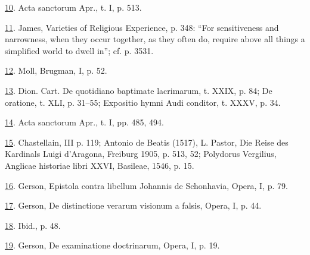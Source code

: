 \protect\hypertarget{23_NOTES.xhtmlux5cux23id_888}{\protect\hyperlink{15_Chapter_Eight__RELIGIOUS_EXCITAT.xhtmlux5cux23id_887}{10}}.
Acta sanctorum Apr., t. I, p. 513.

\protect\hypertarget{23_NOTES.xhtmlux5cux23id_886}{\protect\hyperlink{15_Chapter_Eight__RELIGIOUS_EXCITAT.xhtmlux5cux23id_885}{11}}.
James, Varieties of Religious Experience, p. 348: ``For sensitiveness
and narrowness, when they occur together, as they often do, require
above all things a simplified world to dwell in''; cf. p. 3531.

\protect\hypertarget{23_NOTES.xhtmlux5cux23id_884}{\protect\hyperlink{15_Chapter_Eight__RELIGIOUS_EXCITAT.xhtmlux5cux23id_883}{12}}.
Moll, Brugman, I, p. 52.

\protect\hypertarget{23_NOTES.xhtmlux5cux23id_882}{\protect\hyperlink{15_Chapter_Eight__RELIGIOUS_EXCITAT.xhtmlux5cux23id_881}{13}}.
Dion. Cart. De quotidiano baptimate lacrimarum, t. XXIX, p. 84; De
oratione, t. XLI, p. 31--55; Expositio hymni Audi conditor, t. XXXV, p.
34.

\protect\hypertarget{23_NOTES.xhtmlux5cux23id_880}{\protect\hyperlink{15_Chapter_Eight__RELIGIOUS_EXCITAT.xhtmlux5cux23id_879}{14}}.
Acta sanctorum Apr., t. I, pp. 485, 494.

\protect\hypertarget{23_NOTES.xhtmlux5cux23id_878}{\protect\hyperlink{15_Chapter_Eight__RELIGIOUS_EXCITAT.xhtmlux5cux23id_877}{15}}.
Chastellain, III p. 119; Antonio de Beatis (1517), L. Pastor, Die Reise
des Kardinals Luigi d'Aragona, Freiburg 1905, p. 513, 52; Polydorus
Vergilius, Anglicae historiae libri XXVI, Basileae, 1546, p. 15.

\protect\hypertarget{23_NOTES.xhtmlux5cux23id_876}{\protect\hyperlink{15_Chapter_Eight__RELIGIOUS_EXCITAT.xhtmlux5cux23id_875}{16}}.
Gerson, Epistola contra libellum Johannis de Schonhavia, Opera, I, p.
79.

\protect\hypertarget{23_NOTES.xhtmlux5cux23id_874}{\protect\hyperlink{15_Chapter_Eight__RELIGIOUS_EXCITAT.xhtmlux5cux23id_873}{17}}.
Gerson, De distinctione verarum visionum a falsis, Opera, I, p. 44.

\protect\hypertarget{23_NOTES.xhtmlux5cux23id_872}{\protect\hyperlink{15_Chapter_Eight__RELIGIOUS_EXCITAT.xhtmlux5cux23id_871}{18}}.
Ibid., p. 48.

\protect\hypertarget{23_NOTES.xhtmlux5cux23id_870}{\protect\hyperlink{15_Chapter_Eight__RELIGIOUS_EXCITAT.xhtmlux5cux23id_869}{19}}.
Gerson, De examinatione doctrinarum, Opera, I, p. 19.

